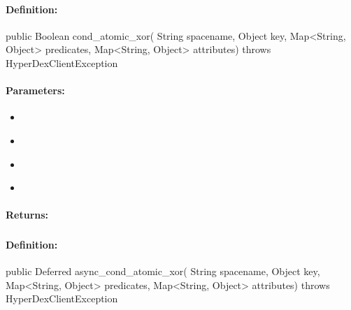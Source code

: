 \paragraph{Definition:}
\begin{javacode}
public Boolean cond_atomic_xor(
        String spacename,
        Object key,
        Map<String, Object> predicates,
        Map<String, Object> attributes) throws HyperDexClientException
\end{javacode}

\paragraph{Parameters:}
\begin{itemize}[noitemsep]
\item {}\\

\item {}\\

\item {}\\

\item {}\\

\end{itemize}

\paragraph{Returns:}


\pagebreak
\subsubsection{}
\label{api:java:async_cond_atomic_xor}


\paragraph{Definition:}
\begin{javacode}
public Deferred async_cond_atomic_xor(
        String spacename,
        Object key,
        Map<String, Object> predicates,
        Map<String, Object> attributes) throws HyperDexClientException
\end{javacode}

